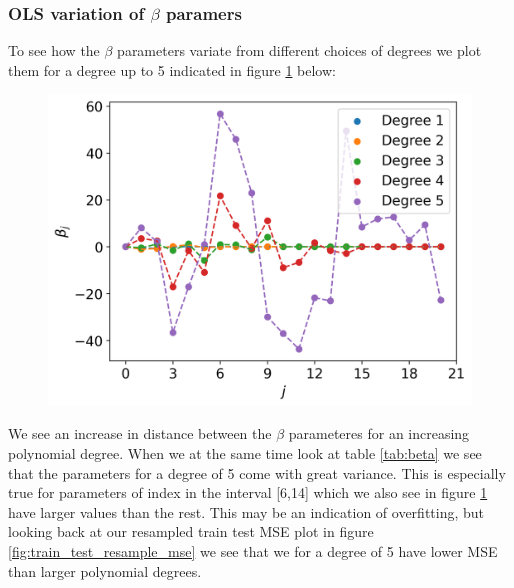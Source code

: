 \documentclass[12pt]{article}
\begin{document}
\subsubsection{OLS variation of $\beta$ paramers}

To see how the $\beta$ parameters variate from different choices of degrees we plot them for a degree up to 5 indicated in figure \ref{fig:beta} below:
\begin{figure}[H]
  \centering
  \includegraphics[width=.7\textwidth]{../figures/beta_degree.png}
  \caption{}
  \label{fig:beta}
\end{figure}
We see an increase in distance between the $\beta$ parameteres for an increasing polynomial degree. When we at the same time look at table \ref{tab:beta} we see that the parameters for a degree of 5 come with great variance. This is especially true for parameters of index in the interval [6,14] which we also see in figure \ref{fig:beta} have larger values than the rest. This may be an indication of overfitting, but looking back at our resampled train test MSE plot in figure \ref{fig:train_test_resample_mse} we see that we for a degree of 5 have lower MSE than larger polynomial degrees.
\end{document}
